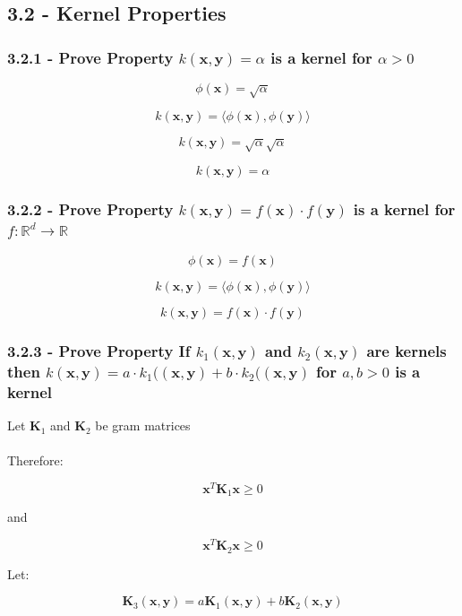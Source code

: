 \documentclass[10pt]{article}
\begin{document}
\subsection{3.2 - Kernel Properties}
\subsubsection{3.2.1 - Prove Property $k(\textbf{x},\textbf{y}) = \alpha $ is a kernel for $\alpha > 0$}

\[
\phi(\textbf{x}) = \sqrt{\alpha}
\]

\[
k(\textbf{x},\textbf{y}) = \langle \phi(\textbf{x}), \phi(\textbf{y}) \rangle
\]

\[
k(\textbf{x},\textbf{y}) = \sqrt{\alpha} \sqrt{\alpha}
\]

\[
k(\textbf{x},\textbf{y}) = \alpha
\]

\subsubsection{3.2.2 - Prove Property $k(\textbf{x},\textbf{y}) = f(\textbf{x}) \cdot f(\textbf{y}) $ is a kernel for $ f: \mathbb{R}^{d} \rightarrow \mathbb{R}$}

\[
\phi(\textbf{x}) = f(\textbf{x})
\]

\[
k(\textbf{x},\textbf{y}) = \langle \phi(\textbf{x}), \phi(\textbf{y}) \rangle
\]

\[
k(\textbf{x},\textbf{y}) = f(\textbf{x}) \cdot f(\textbf{y})
\]


\subsubsection{3.2.3 - Prove Property If $k_1(\textbf{x},\textbf{y})$ and $k_2(\textbf{x},\textbf{y})$ are kernels then $k(\textbf{x},\textbf{y}) = a \cdot k_1((\textbf{x},\textbf{y}) + b \cdot k_2((\textbf{x},\textbf{y})$ for $a,b > 0$ is a kernel}

Let $\textbf{K}_1$ and $\textbf{K}_2$ be gram matrices
\\ \\
Therefore: 

\[
\textbf{x}^{T} \textbf{K}_1 \textbf{x} \geq 0
\]

and 

\[
\textbf{x}^{T} \textbf{K}_2 \textbf{x} \geq 0
\]
 
Let: 

\[
\textbf{K}_{3}(\textbf{x},\textbf{y}) = a \textbf{K}_{1}(\textbf{x},\textbf{y}) + b  \textbf{K}_{2}(\textbf{x},\textbf{y})
\]
\end{document}
